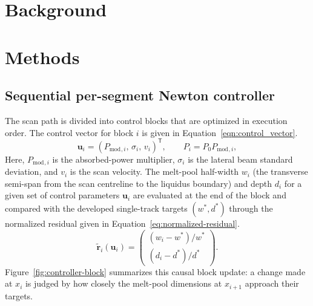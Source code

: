 \documentclass[11pt]{article}
\title{}
\author{}
\date{}
\newcommand{\Pmod}{P_{\mathrm{mod}}}
\begin{document}
\maketitle

\begin{abstract}
\end{abstract}

\section{Background}
\label{sec:background}

\section{Methods}
\label{sec:methods}

\subsection{Sequential per-segment Newton controller}
\label{sec:methods:controller}

The scan path is divided into control blocks that are optimized in execution
order. The control vector for block $i$ is given in Equation~\eqref{eqn:control_vector}.
\begin{equation}
	\label{eqn:control_vector}
  \mathbf{u}_i = (\Pmod{}_{,i},\,\sigma_i,\,v_i)^{\mathsf T},
  \qquad P_i=P_0\Pmod{}_{,i},
\end{equation}
Here, $\Pmod{}_{,i}$ is the absorbed-power multiplier, $\sigma_i$ is the lateral
beam standard deviation, and $v_i$ is the scan velocity. The melt-pool
half-width $w_i$ (the transverse semi-span from the scan centreline to the
liquidus boundary) and depth $d_i$ for a given set of control parameters
$\mathbf{u}_i$ are evaluated at the end of the block and compared
with the developed single-track targets $(w^*,d^*)$ through the normalized
residual given in Equation~\eqref{eq:normalized-residual}.
\begin{equation}
  \widetilde{\mathbf r}_i(\mathbf u_i)=
  \begin{pmatrix}
    (w_i-w^*)/w^*\\
    (d_i-d^*)/d^*
  \end{pmatrix}.
  \label{eq:normalized-residual}
\end{equation}
Figure~\ref{fig:controller-block} summarizes this causal block update: a
change made at $x_i$ is judged by how closely the melt-pool dimensions at
$x_{i+1}$ approach their targets.
\end{document}
